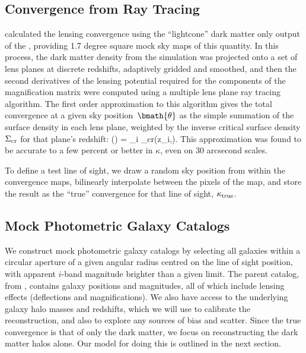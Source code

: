 \documentclass[useAMS,usenatbib]{mn2e}
\begin{document}
\subsection{Convergence from Ray Tracing}
\label{sec:MS:raytracing}

\citet{HilbertEtal2009} calculated the lensing convergence using the
``lightcone'' dark matter only 
output of the \MS, providing 1.7 degree square 
mock sky maps of this
quantity. In this process, the dark matter density from the simulation
was projected onto a set of lens planes at discrete redshifts,
adaptively gridded and smoothed, and then the second derivatives of the 
lensing potential required for the components of the magnification
matrix were computed using a multiple lens plane ray tracing algorithm.
The first order approximation to this algorithm \citep[equation 17
of][]{HilbertEtal2009} gives the total convergence at a given sky
position~$\bmath{\theta}$ as the simple summation of the surface density
in each lens plane, weighted by the inverse critical surface density
$\Sigma_{\rm cr}$ for that plane's redshift:
\be
\kappa(\bmath{\theta}) = \sum_i 
                                     {\Sigma_{\rm cr}(z_i,\zs)}.
\ee
This approximation was found to be accurate to a few percent or better
in $\kappa$, even on 30 arcsecond scales.

To define a test line of sight, we draw a random sky position from
within the convergence maps, bilinearly interpolate between the pixels
of the map, and store the result as the ``true'' convergence for that
line of sight, $\kappa_{\rm true}$. 



\subsection{Mock Photometric Galaxy Catalogs}
\label{sec:MS:mocks}

We construct mock photometric galaxy catalogs by selecting all \MS
galaxies within a circular aperture of a given angular radius centred on
the line of sight position, with apparent $i$-band magnitude brighter
than a given limit. The parent catalog, from \citet{HilbertEtal2011},
contains galaxy positions and magnitudes, all of which include lensing
effects (deflections and magnifications). We also have access to the
underlying galaxy halo masses and redshifts, which we will use to
calibrate the reconstruction, and also to explore any sources of bias
and scatter. Since the true convergence is that of only the dark matter,
we focus on reconstructing the dark matter halos alone. Our model for
doing this is outlined in the next section. 
\end{document}
